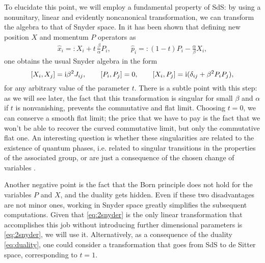 \documentclass[a4paper,10pt]{amsart}
\begin{document}
To elucidate this point, we will employ a fundamental property of SdS: by using a nonunitary, linear and evidently noncanonical transformation,
we can transform the algebra to that of Snyder space.
In \cite{Mignemi:2009zz,Mignemi:2015una} it has been shown that defining new position $X$ and momentum $P$ operators as
\begin{align}\label{eq:2snyder}
 \hat{x}_i=:X_i+t\, \frac{\beta}{\alpha} P_i, &\qquad \hat{p}_i=:(1-t)P_i -\frac{\alpha}{\beta} X_i,
\end{align}
one obtains the usual Snyder algebra in the form
\begin{equation}\label{eq:Snyder}
 [X_i,X_j]={\rm i}\beta^2 J_{ij}, \qquad [P_i,P_j]=0,\qquad [X_i,P_j]={\rm i}(\delta_{ij}+\beta^2P_iP_j),
\end{equation}
for any arbitrary value of the parameter $t$. There is a subtle point with this step:
as we will see later, the fact that this transformation is singular for small $\beta$ and $\alpha$
if $t$ is nonvanishing, prevents the commutative and flat limit.
Choosing $t=0$, we can conserve a smooth flat limit; the price that we have to pay is the fact that we won't be able to recover the curved commutative limit,
but only the commutative flat one.
An interesting question is whether these singularities are related to the existence of quantum phases,
i.e. related to singular transitions in the properties of the associated group, or are just a consequence of the chosen change of variables \cite{Nair:2000ii,Bellucci:2001xp}.

Another negative point is the fact that the Born principle does not hold for the variables $P$ and $X$, and the duality gets hidden.
Even if these two disadvantages are not minor ones,
working in Snyder space greatly simplifies the subsequent computations.
Given that \eqref{eq:2snyder} is the only linear transformation that accomplishes this job  without introducing further dimensional parameters
is \eqref{eq:2snyder}, we will use it.
Alternatively, as a consequence of the duality \eqref{eq:duality},
one could consider a transformation that goes from SdS to de Sitter space, corresponding to $t=1$.
\end{document}
